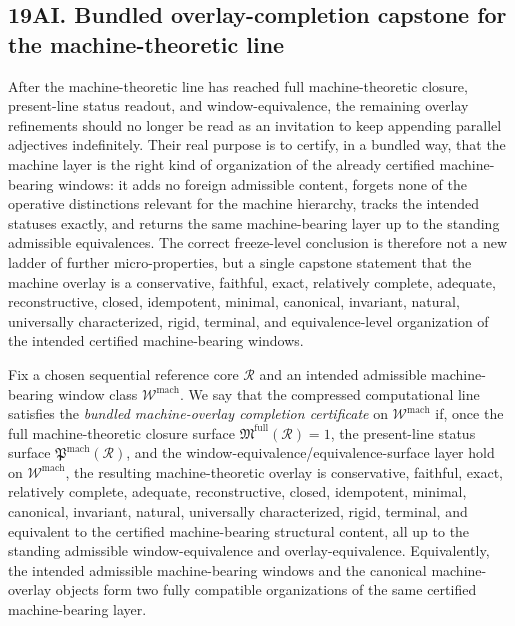 \subsection*{19AI. Bundled overlay-completion capstone for the machine-theoretic line}
After the machine-theoretic line has reached full machine-theoretic closure, present-line status readout, and window-equivalence, the remaining overlay refinements should no longer be read as an invitation to keep appending parallel adjectives indefinitely. Their real purpose is to certify, in a bundled way, that the machine layer is the right kind of organization of the already certified machine-bearing windows: it adds no foreign admissible content, forgets none of the operative distinctions relevant for the machine hierarchy, tracks the intended statuses exactly, and returns the same machine-bearing layer up to the standing admissible equivalences. The correct freeze-level conclusion is therefore not a new ladder of further micro-properties, but a single capstone statement that the machine overlay is a conservative, faithful, exact, relatively complete, adequate, reconstructive, closed, idempotent, minimal, canonical, invariant, natural, universally characterized, rigid, terminal, and equivalence-level organization of the intended certified machine-bearing windows.

\begin{definition}
Fix a chosen sequential reference core \(\mathcal R\) and an intended admissible machine-bearing window class \(\mathcal W^{\mathrm{mach}}\). We say that the compressed computational line satisfies the \emph{bundled machine-overlay completion certificate} on \(\mathcal W^{\mathrm{mach}}\) if, once the full machine-theoretic closure surface \(\mathfrak M^{\mathrm{full}}(\mathcal R)=1\), the present-line status surface \(\mathfrak P^{\mathrm{mach}}(\mathcal R)\), and the window-equivalence/equivalence-surface layer hold on \(\mathcal W^{\mathrm{mach}}\), the resulting machine-theoretic overlay is conservative, faithful, exact, relatively complete, adequate, reconstructive, closed, idempotent, minimal, canonical, invariant, natural, universally characterized, rigid, terminal, and equivalent to the certified machine-bearing structural content, all up to the standing admissible window-equivalence and overlay-equivalence. Equivalently, the intended admissible machine-bearing windows and the canonical machine-overlay objects form two fully compatible organizations of the same certified machine-bearing layer.
\end{definition}

